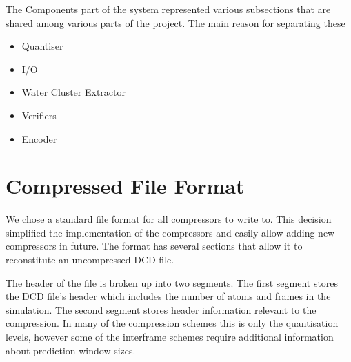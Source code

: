 \documentclass[a4paper,11pt]{report}
\begin{document}
The Components part of the system represented various subsections that are shared among various parts of the project. The main reason for separating these 

\begin{itemize}
 \item Quantiser
 \item I/O
 \item Water Cluster Extractor
 \item Verifiers
 \item Encoder
\end{itemize}

% 





\section{Compressed File Format}

We chose a standard file format for all compressors to write to. This decision simplified the implementation of the compressors and easily allow adding new compressors in future. The format has several sections that allow it to reconstitute an uncompressed DCD file.

The header of the file is broken up into two segments. The first segment stores the DCD file's header which includes the number of atoms and frames in the simulation. The second segment stores header information relevant to the compression. In many of the compression schemes this is only the quantisation levels, however some of the interframe schemes require additional information about prediction window sizes.
\end{document}
